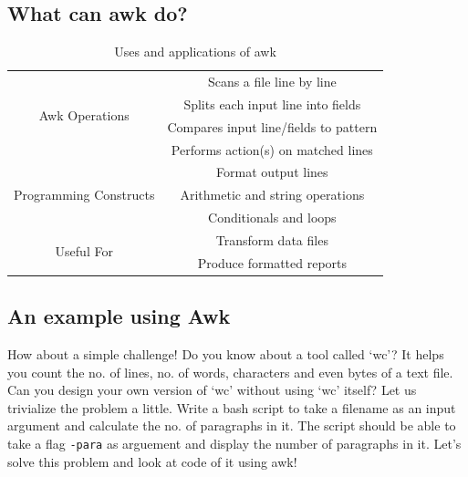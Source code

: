 \documentclass[12pt]{article}
\begin{document}
\subsection{What can awk do?}
\begin{table}[H]
    \centering
    \begin{tabular}{|c|c|}
         \hline
         \multirow{4}{*}{Awk Operations\cite{Awk:10}} & Scans a file line by line \\ \cline{2-2}
         &  Splits each input line into fields \\ \cline{2-2}
         & Compares input line/fields to pattern \\ \cline{2-2}
         & Performs action(s) on matched lines \\ 
         \hline
         \multirow{3}{*}{Programming Constructs} & Format output lines \\ \cline{2-2}
         & Arithmetic and string operations \\ \cline{2-2}
         & Conditionals and loops \\ \cline{2-2}
         \hline
         \multirow{2}{*}{Useful For} & Transform data files  \\ \cline{2-2}
         & Produce formatted reports \\ 
         \hline
    \end{tabular}
    \caption{Uses and applications of awk}
\end{table}

\subsection{An example using Awk}
How about a simple challenge! Do you know about a tool called ‘wc’? It helps you count the no. of lines, no. of words, characters and even bytes of a text file. \\
Can you design your own version of ‘wc’ without using ‘wc’ itself? Let us trivialize the problem a little. Write a bash script to take a filename as an input argument and calculate the no. of paragraphs in it. The script should be able to take a flag \texttt{-para} as arguement and display the number of paragraphs in it. Let's solve this problem and look at code of it using awk!
\end{document}
